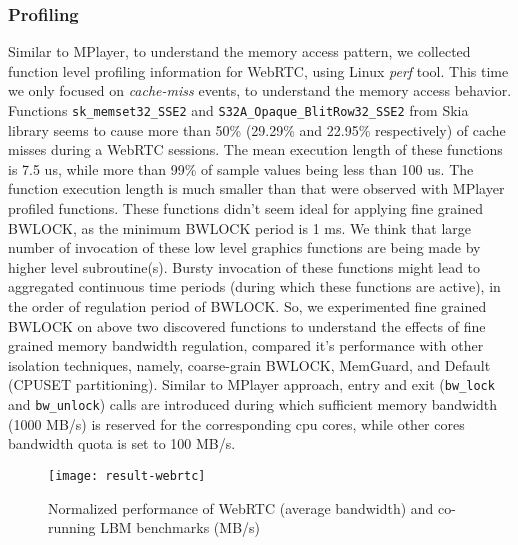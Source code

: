 \documentclass[times, 10pt,onecolumn]{article}
\begin{document}
\subsubsection{Profiling}
Similar to MPlayer, to understand the memory access pattern, we
collected function level profiling information for WebRTC, using Linux
\emph{perf} tool. This time we only focused on \emph{cache-miss}
events, to understand the memory access behavior. Functions
\texttt{sk\_memset32\_SSE2} and \texttt{S32A\_Opaque\_BlitRow32\_SSE2}
from Skia library seems to cause more than 50\% (29.29\% and 22.95\%
respectively) of cache misses during a WebRTC sessions. The mean
execution length of these functions is 7.5 us, while more than 99\% of
sample values being less than 100 us. The function execution length
is much smaller than that were observed with MPlayer profiled
functions. These functions didn't seem ideal for applying fine grained
BWLOCK, as the minimum BWLOCK period is 1 ms. We think that large
number of invocation of these low level graphics functions are being
made by higher level subroutine(s). Bursty invocation of these
functions might lead to aggregated continuous time periods (during
which these functions are active), in the order of regulation period
of BWLOCK. So, we experimented fine grained BWLOCK on above two
discovered functions to understand the effects of fine grained memory
bandwidth regulation, compared it's performance with other isolation
techniques, namely, coarse-grain BWLOCK, MemGuard, and Default (CPUSET
partitioning). Similar to MPlayer approach, entry and exit
(\texttt{bw\_lock} and \texttt{bw\_unlock}) calls are introduced
during which sufficient memory bandwidth (1000 MB/s) is reserved for
the corresponding cpu cores, while other cores bandwidth quota is set
to 100 MB/s.

\begin{figure}
\centering
\texttt{[image: result-webrtc]}
\caption{Normalized performance of WebRTC (average bandwidth) and
co-running LBM benchmarks (MB/s)}
\label{fig:result-webrtc}
\end{figure}
\end{document}
